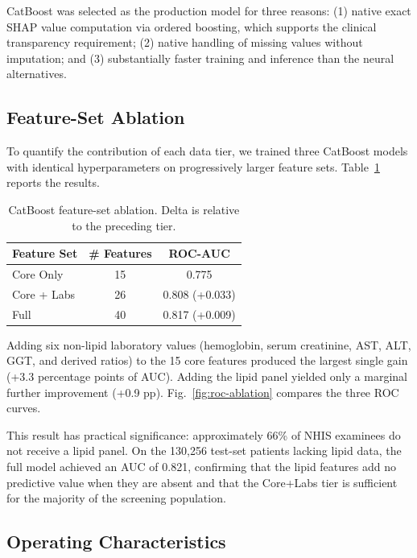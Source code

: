 CatBoost was selected as the production model for three reasons: (1) native exact SHAP value computation via ordered boosting, which supports the clinical transparency requirement; (2) native handling of missing values without imputation; and (3) substantially faster training and inference than the neural alternatives.

\subsection{Feature-Set Ablation}
\label{sec:results-ablation}

To quantify the contribution of each data tier, we trained three CatBoost models with identical hyperparameters on progressively larger feature sets. Table~\ref{tab:ablation} reports the results.

\begin{table}[ht]
\centering
\caption{CatBoost feature-set ablation. Delta is relative to the preceding tier.}
\label{tab:ablation}
\begin{tabular}{lcc}
\hline
\textbf{Feature Set} & \textbf{\# Features} & \textbf{ROC-AUC} \\
\hline
Core Only    & 15 & 0.775 \\
Core + Labs  & 26 & 0.808 (+0.033) \\
Full         & 40 & 0.817 (+0.009) \\
\hline
\end{tabular}
\end{table}

Adding six non-lipid laboratory values (hemoglobin, serum creatinine, AST, ALT, GGT, and derived ratios) to the 15 core features produced the largest single gain (+3.3 percentage points of AUC). Adding the lipid panel yielded only a marginal further improvement (+0.9 pp). Fig.~\ref{fig:roc-ablation} compares the three ROC curves.

This result has practical significance: approximately 66\% of NHIS examinees do not receive a lipid panel. On the 130,256 test-set patients lacking lipid data, the full model achieved an AUC of 0.821, confirming that the lipid features add no predictive value when they are absent and that the Core+Labs tier is sufficient for the majority of the screening population.

\subsection{Operating Characteristics}
\label{sec:results-threshold}

